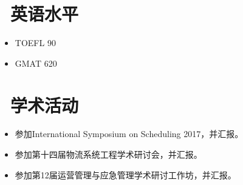 \documentclass[11pt]{article}
\begin{document}
\section{\makebox[\widthof{\faGraduationCap}][c]{\color{CVBlue}\faLanguage}\ 英语水平}
\begin{itemize}[parsep=0.5ex]
  \item TOEFL 90
  \item GMAT 620
\end{itemize}

\section{\makebox[\widthof{\faGraduationCap}][c]{\color{CVBlue}\faInfo}\ 学术活动}
\begin{itemize}[parsep=0.5ex]
	\item 参加International Symposium on Scheduling 2017，并汇报。
	\item 参加第十四届物流系统工程学术研讨会，并汇报。
	\item 参加第12届运营管理与应急管理学术研讨工作坊，并汇报。
\end{itemize}


\end{document}
